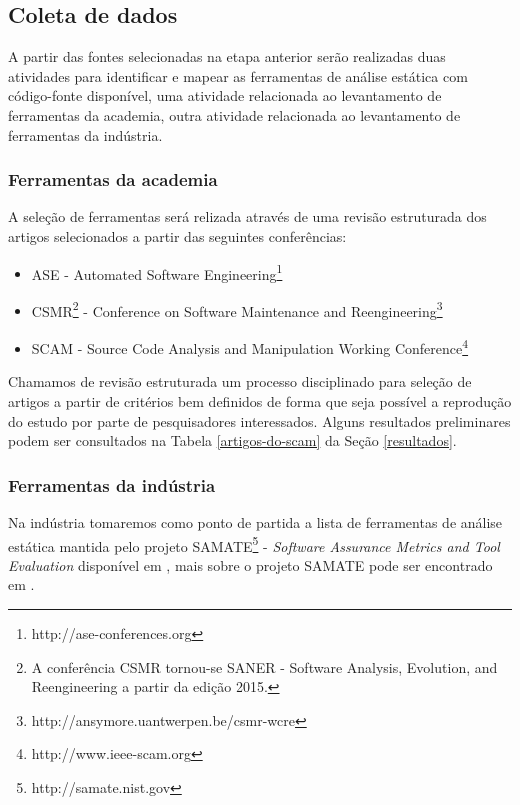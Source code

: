 \documentclass[12pt]{article}
\begin{document}
\subsection{Coleta de dados}

A partir das fontes selecionadas na etapa anterior serão realizadas duas
atividades para identificar e mapear as ferramentas de análise estática com
código-fonte disponível, uma atividade relacionada ao levantamento de
ferramentas da academia, outra atividade relacionada ao levantamento de
ferramentas da indústria.

\subsubsection{Ferramentas da academia}

A seleção de ferramentas será relizada através de uma revisão estruturada dos
artigos selecionados a partir das seguintes conferências:

\begin{itemize}
  \item ASE - Automated Software
    Engineering\footnote{http://ase-conferences.org}
  \item CSMR\footnote{A conferência CSMR tornou-se SANER - Software Analysis,
    Evolution, and Reengineering a partir da edição 2015.} - Conference on
    Software Maintenance and
    Reengineering\footnote{http://ansymore.uantwerpen.be/csmr-wcre}
  \item SCAM - Source Code Analysis and Manipulation Working
    Conference\footnote{http://www.ieee-scam.org}
\end{itemize}

Chamamos de revisão estruturada um processo disciplinado para seleção de
artigos a partir de critérios bem definidos de forma que seja possível a
reprodução do estudo por parte de pesquisadores interessados. Alguns
resultados preliminares podem ser consultados na Tabela \ref{artigos-do-scam}
da Seção \ref{resultados}.

\subsubsection{Ferramentas da indústria}

Na indústria tomaremos como ponto de partida a lista de
ferramentas de análise estática mantida pelo projeto SAMATE\footnote{
http://samate.nist.gov} - {\em Software Assurance Metrics and Tool Evaluation}
disponível em , mais sobre o projeto SAMATE pode
ser encontrado em . \\
\end{document}
